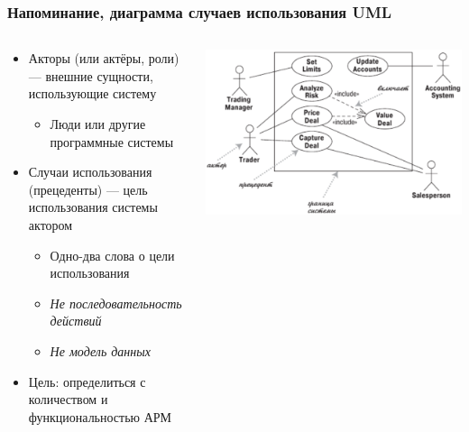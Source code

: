 \documentclass{../../slides-style}
\begin{document}
    \begin{frame}[plain]
        \titlepage
    \end{frame}

    \begin{frame}
        \frametitle{Напоминание, диаграмма случаев использования UML}
        \begin{columns}
            \begin{column}{0.6\textwidth}
                \begin{itemize}
                    \item Акторы (или актёры, роли) --- внешние сущности, использующие систему
                    \begin{itemize}
                        \item Люди или другие программные системы
                    \end{itemize}
                    \item Случаи использования (прецеденты)  --- цель использования системы актором
                    \begin{itemize}
                        \item Одно-два слова о цели использования
                        \item \textit{Не последовательность действий}
                        \item \textit{Не модель данных}
                    \end{itemize}
                    \item Цель: определиться с количеством и функциональностью АРМ
                \end{itemize}
            \end{column}
            \begin{column}{0.4\textwidth}
                \begin{center}
                    \includegraphics[width=\textwidth]{useCaseDiagram.png}
                \end{center}
            \end{column}
        \end{columns}
    \end{frame}
\end{document}
